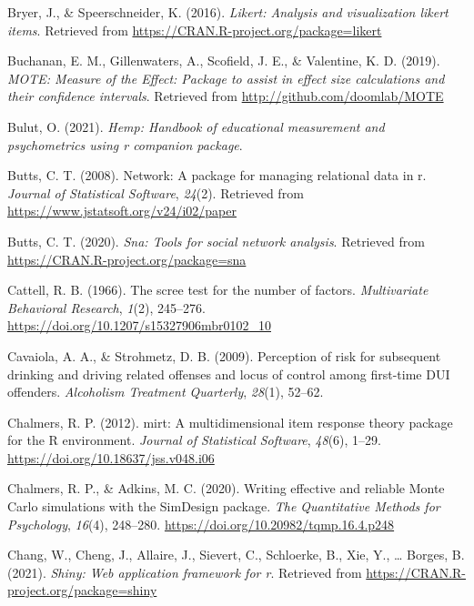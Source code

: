 \documentclass[
  english,
  man]{apa6}
\newlength{\cslhangindent}
\newlength{\cslentryspacingunit} %
\newenvironment{CSLReferences}[2] %
 {%
  \setlength{\parindent}{0pt}
  \ifodd #1
  \let\oldpar\par
  \def\par{\hangindent=\cslhangindent\oldpar}
  \fi
  \setlength{\parskip}{#2\cslentryspacingunit}
 }%
 {}
\begin{document}
\begin{CSLReferences}{1}{0}
\leavevmode{}%
Bryer, J., \& Speerschneider, K. (2016). \emph{Likert: Analysis and visualization likert items}. Retrieved from \url{https://CRAN.R-project.org/package=likert}

\leavevmode{}%
Buchanan, E. M., Gillenwaters, A., Scofield, J. E., \& Valentine, K. D. (2019). \emph{{MOTE: Measure of the Effect}: Package to assist in effect size calculations and their confidence intervals}. Retrieved from \url{http://github.com/doomlab/MOTE}

\leavevmode{}%
Bulut, O. (2021). \emph{Hemp: Handbook of educational measurement and psychometrics using r companion package}.

\leavevmode{}%
Butts, C. T. (2008). Network: A package for managing relational data in r. \emph{Journal of Statistical Software}, \emph{24}(2). Retrieved from \url{https://www.jstatsoft.org/v24/i02/paper}

\leavevmode{}%
Butts, C. T. (2020). \emph{Sna: Tools for social network analysis}. Retrieved from \url{https://CRAN.R-project.org/package=sna}

\leavevmode{}%
Cattell, R. B. (1966). The scree test for the number of factors. \emph{Multivariate Behavioral Research}, \emph{1}(2), 245--276. \url{https://doi.org/10.1207/s15327906mbr0102_10}

\leavevmode{}%
Cavaiola, A. A., \& Strohmetz, D. B. (2009). Perception of risk for subsequent drinking and driving related offenses and locus of control among first-time DUI offenders. \emph{Alcoholism Treatment Quarterly}, \emph{28}(1), 52--62.

\leavevmode{}%
Chalmers, R. P. (2012). {mirt}: A multidimensional item response theory package for the {R} environment. \emph{Journal of Statistical Software}, \emph{48}(6), 1--29. \url{https://doi.org/10.18637/jss.v048.i06}

\leavevmode{}%
Chalmers, R. P., \& Adkins, M. C. (2020). Writing effective and reliable {Monte Carlo} simulations with the {SimDesign} package. \emph{The Quantitative Methods for Psychology}, \emph{16}(4), 248--280. \url{https://doi.org/10.20982/tqmp.16.4.p248}

\leavevmode{}%
Chang, W., Cheng, J., Allaire, J., Sievert, C., Schloerke, B., Xie, Y., \ldots{} Borges, B. (2021). \emph{Shiny: Web application framework for r}. Retrieved from \url{https://CRAN.R-project.org/package=shiny}


\end{CSLReferences}
\end{document}
